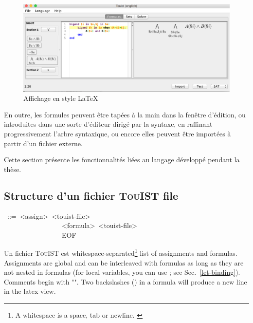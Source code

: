 \begin{figure}[htbp]
\centering
\includegraphics[scale=0.45]{Pictures/LatexDisplay.png}
  \caption{Affichage en style \LaTeX}
  \label{fig:LatexDisplay}
\end{figure}


En outre, les formules peuvent être tapées à la main dans la fenêtre d'édition, ou introduites dans une sorte d'éditeur dirigé par la syntaxe, en raffinant progressivement l'arbre syntaxique, ou encore elles peuvent être importées à partir d'un fichier externe.









Cette section présente les fonctionnalités liées au langage développé pendant la thèse.

\subsection{Structure d'un fichier {\scshape TouIST} file}\label{sec-structure-of-a-touist-file}%
\begin{mdpre}%
~::=~{\textless{}assign\textgreater{}}~{\textless{}touist-file\textgreater{}}\\
~~~~~~~~~~~~~~~~\textbar{}~{\textless{}formula\textgreater{}}~{\textless{}touist-file\textgreater{}}\\
~~~~~~~~~~~~~~~~\textbar{}~EOF%
\end{mdpre}\noindent Un fichier {\scshape TouIST} est  whitespace-separated\footnote{\noindent A whitespace is a space, tab or newline.%
\label{fn-whitespace}%
} list of
assignments and formulas. Assignments are global and can be interleaved
with formulas as long as they are not nested in formulas (for local
variables, you can use ; see Sec.~\ref{let-binding}). Comments begin
with "". Two backslashes (\mdcode{\textbackslash{}\textbackslash{}}) in a formula will produce a new
line in the latex view.

